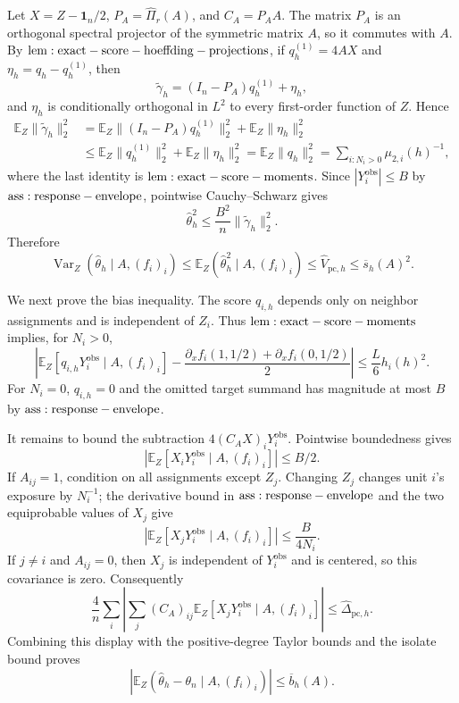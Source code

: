 Let \(X=Z-\mathbf1_n/2\), \(P_A=\widehat\Pi_r(A)\), and \(C_A=P_AA\).  The matrix \(P_A\) is an orthogonal spectral projector of the symmetric matrix \(A\), so it commutes with \(A\).  By \({\rm lem:exact-score-hoeffding-projections}\), if \(q_h^{(1)}=4AX\) and \(\eta_h=q_h-q_h^{(1)}\), then
\[
 \widetilde\gamma_h=(I_n-P_A)q_h^{(1)}+\eta_h,
\]
and \(\eta_h\) is conditionally orthogonal in \(L^2\) to every first-order function of \(Z\).  Hence
\[
\begin{aligned}
 \mathbb E_Z\|\widetilde\gamma_h\|_2^2
 &=\mathbb E_Z\|(I_n-P_A)q_h^{(1)}\|_2^2
   +\mathbb E_Z\|\eta_h\|_2^2\\
 &\leq\mathbb E_Z\|q_h^{(1)}\|_2^2+\mathbb E_Z\|\eta_h\|_2^2
 =\mathbb E_Z\|q_h\|_2^2
 =\sum_{i:N_i>0}\mu_{2,i}(h)^{-1},
\end{aligned}
\]
where the last identity is \({\rm lem:exact-score-moments}\).  Since \(|Y_i^{\mathrm{obs}}|\leq B\) by \({\rm ass:response-envelope}\), pointwise Cauchy--Schwarz gives
\[
 \widehat\theta_h^2
 \leq \frac{B^2}{n}\|\widetilde\gamma_h\|_2^2.
\]
Therefore
\[
 \operatorname{Var}_Z(\widehat\theta_h\mid A,(f_i)_i)
 \leq\mathbb E_Z(\widehat\theta_h^2\mid A,(f_i)_i)
 \leq\widehat V_{\mathrm{pc},h}
 \leq\overline s_h(A)^2.
\]

We next prove the bias inequality.  The score \(q_{i,h}\) depends only on neighbor assignments and is independent of \(Z_i\).  Thus \({\rm lem:exact-score-moments}\) implies, for \(N_i>0\),
\[
 \left|\mathbb E_Z[q_{i,h}Y_i^{\mathrm{obs}}\mid A,(f_i)_i]
 -\frac{\partial_xf_i(1,1/2)+\partial_xf_i(0,1/2)}2\right|
 \leq\frac L6h_i(h)^2.
\]
For \(N_i=0\), \(q_{i,h}=0\) and the omitted target summand has magnitude at most \(B\) by \({\rm ass:response-envelope}\).

It remains to bound the subtraction \(4(C_AX)_iY_i^{\mathrm{obs}}\).  Pointwise boundedness gives
\[
 |\mathbb E_Z[X_iY_i^{\mathrm{obs}}\mid A,(f_i)_i]|\leq B/2.
\]
If \(A_{ij}=1\), condition on all assignments except \(Z_j\).  Changing \(Z_j\) changes unit \(i\)'s exposure by \(N_i^{-1}\); the derivative bound in \({\rm ass:response-envelope}\) and the two equiprobable values of \(X_j\) give
\[
 |\mathbb E_Z[X_jY_i^{\mathrm{obs}}\mid A,(f_i)_i]|\leq \frac{B}{4N_i}.
\]
If \(j\neq i\) and \(A_{ij}=0\), then \(X_j\) is independent of \(Y_i^{\mathrm{obs}}\) and is centered, so this covariance is zero.  Consequently
\[
 \frac4n\sum_i\left|\sum_j(C_A)_{ij}
 \mathbb E_Z[X_jY_i^{\mathrm{obs}}\mid A,(f_i)_i]\right|
 \leq\widehat\Delta_{\mathrm{pc},h}.
\]
Combining this display with the positive-degree Taylor bounds and the isolate bound proves
\[
 |\mathbb E_Z(\widehat\theta_h-\theta_n\mid A,(f_i)_i)|\leq\overline b_h(A).
\]

